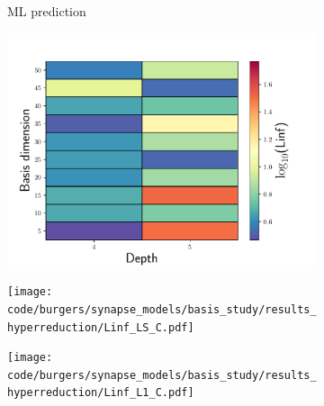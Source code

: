 \documentclass[3p,computermodern,10pt]{elsarticle}
\begin{document}
\begin{figure}
\begin{center}
\begin{subfigure}[t]{0.24\textwidth}
\caption{ML prediction}
\label{fig:burg_hyperrom_results4}
\end{subfigure}
\begin{subfigure}[t]{0.24\textwidth}
\includegraphics[trim={0cm 0cm 0cm 0cm},clip,width=1.0\linewidth]{code/burgers/synapse_models/basis_study/results_hyperreduction/Linf_LS.pdf}
\caption{\PSTLSROMGNAT}
\label{fig:burg_hyperrom_results7}
\end{subfigure}
\begin{subfigure}[t]{0.24\textwidth}
\texttt{[image: code/burgers/synapse\_models/basis\_study/results\_hyperreduction/Linf\_LS\_C.pdf]}
\caption{\PSTLSROMCOLLOC}
\label{fig:burg_hyperrom_results8}
\end{subfigure}
\begin{subfigure}[t]{0.24\textwidth}
\texttt{[image: code/burgers/synapse\_models/basis\_study/results\_hyperreduction/Linf\_L1\_C.pdf]}

\end{subfigure}
\end{center}
\end{figure}
\end{document}
